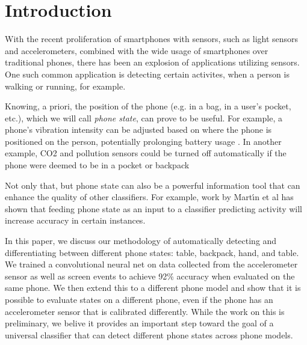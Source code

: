 \section{Introduction}
With the recent proliferation of smartphones with sensors, such as light sensors and accelerometers,
 combined with the wide usage of smartphones over traditional phones, 
 there has been an explosion of applications utilizing sensors.
One such common application is detecting certain activites, when a person is walking or running, for example.

Knowing, a priori, the position of the phone (e.g. in a bag, in a user's pocket, etc.), 
 which we will call \textit{phone state}, can prove to be useful.
For example, a phone's vibration intensity can be adjusted based on where the phone is positioned on the person, potentially prolonging battery usage \cite{Fujinami}.
In another example, CO2 and pollution sensors could be turned off automatically if the phone were deemed to be in a pocket or backpack \cite{Miluzzo2010} 

Not only that, but phone state can also be a powerful information tool that can enhance the quality of other classifiers.
For example, work by Mart\'{\i}n et al has shown that feeding phone state as an input to a classifier predicting activity will increase accuracy in certain instances\cite{Martin}.  


In this paper, we discuss our methodology of automatically detecting and differentiating between different phone states: table, backpack, hand, and table. 
We trained a convolutional neural net on data collected from the accelerometer sensor 
 as well as screen events to achieve 92\% accuracy when evaluated on the same phone.
We then extend this to a different phone model and show that it is possible to evaluate states on a 
 different phone, even if the phone has an accelerometer sensor that is calibrated differently.
While the work on this is preliminary, we belive it provides an important step toward the goal of a 
universal classifier that can detect different phone states across phone models. 

